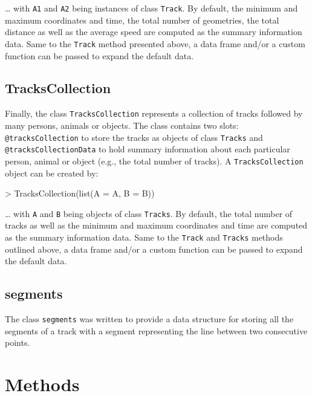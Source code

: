 \documentclass{article}
\newcommand{\code}[1]{{\tt #1}}
\begin{document}
\dots{} with \code{A1} and \code{A2} being instances of class \code{Track}. By default, the minimum and maximum coordinates and time, the total number of geometries, the total distance as well as the average speed are computed as the summary information data. Same to the \code{Track} method presented above, a data frame and/or a custom function can be passed to expand the default data.

\subsection{TracksCollection}

Finally, the class \code{TracksCollection} represents a collection of tracks followed by many persons, animals or objects. The class contains two slots: \code{@tracksCollection} to store the tracks as objects of class \code{Tracks} and \code{@tracksCollectionData} to hold summary information about each particular person, animal or object (e.g., the total number of tracks). A \code{TracksCollection} object can be created by:

\begin{Schunk}
\begin{Sinput}
> TracksCollection(list(A = A, B = B))
\end{Sinput}
\end{Schunk}

\dots{} with \code{A} and \code{B} being objects of class \code{Tracks}. By default, the total number of tracks as well as the minimum and maximum coordinates and time are computed as the summary information data. Same to the \code{Track} and \code{Tracks} methods outlined above, a data frame and/or a custom function can be passed to expand the default data.

\subsection{segments}

The class \code{segments} was written to provide a data structure for storing all the segments of a track with a segment representing the line between two consecutive points.

\section{Methods}
\end{document}
